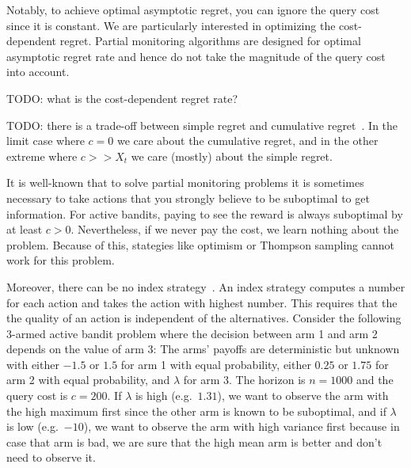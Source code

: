 \documentclass[a4paper]{article}
\begin{document}
Notably, to achieve optimal asymptotic regret, you can ignore the query cost since it is constant.
We are particularly interested in optimizing
the cost-dependent regret.
Partial monitoring algorithms are designed for optimal asymptotic regret rate and hence do not take the magnitude of the query cost into account.

TODO: what is the cost-dependent regret rate?

TODO: there is a trade-off between simple regret and cumulative regret~\citep[Thm.~1]{Bubeck11}. In the limit case where $c = 0$ we care about the cumulative regret, and in the other extreme where $c >> X_t$ we care (mostly) about the simple regret.

It is well-known that to solve partial monitoring problems
it is sometimes necessary to take actions that you strongly believe to be suboptimal to get information.
For active bandits, paying to see the reward is always suboptimal
by at least $c > 0$.
Nevertheless, if we never pay the cost, we learn nothing about the problem.
Because of this, stategies like optimism or Thompson sampling cannot work for this problem.

Moreover, there can be no index strategy~\citep[Ex.~4]{Hay12}.
An index strategy computes a number for each action
and takes the action with highest number.
This requires that
the the quality of an action is independent of the alternatives.
Consider the following 3-armed active bandit problem
where the decision between arm 1 and arm 2 depends
on the value of arm 3:
The arms' payoffs are deterministic but unknown with
either $-1.5$ or $1.5$ for arm 1 with equal probability,
either $0.25$ or $1.75$ for arm 2 with equal probability, and
$\lambda$ for arm 3.
The horizon is $n = 1000$
and the query cost is $c = 200$.
If $\lambda$ is high (e.g.\ $1.31$),
we want to observe the arm with the high maximum first
since the other arm is known to be suboptimal, and
if $\lambda$ is low (e.g.\ $-10$),
we want to observe the arm with high variance first
because in case that arm is bad, we are sure that
the high mean arm is better and don't need to observe it.
\end{document}
